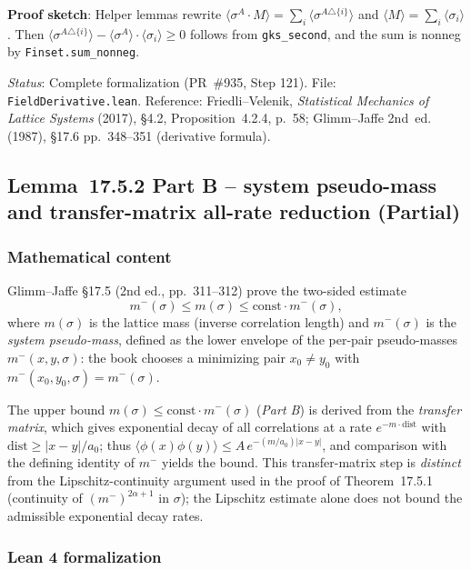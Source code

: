 \documentclass[a4paper,11pt]{article}
\begin{document}
\noindent\textbf{Proof sketch}:
Helper lemmas rewrite $\langle \sigma^A \cdot M \rangle = \sum_i \langle \sigma^{A\triangle\{i\}}\rangle$
and $\langle M \rangle = \sum_i \langle \sigma_i \rangle$.
Then $\langle \sigma^{A\triangle\{i\}}\rangle - \langle \sigma^A \rangle \cdot \langle \sigma_i \rangle \geq 0$
follows from \texttt{gks\_second}, and the sum is nonneg by \texttt{Finset.sum\_nonneg}.

\noindent\textit{Status}: Complete formalization (PR~\#935, Step 121).
File: \texttt{FieldDerivative.lean}.
Reference: Friedli--Velenik, \emph{Statistical Mechanics of Lattice Systems} (2017),
\S4.2, Proposition~4.2.4, p.~58;
Glimm--Jaffe 2nd~ed. (1987), \S17.6 pp.~348--351 (derivative formula).

\subsection*{Lemma~17.5.2 Part B -- system pseudo-mass and transfer-matrix
all-rate reduction (Partial)}

\subsubsection*{Mathematical content}

Glimm--Jaffe \S17.5 (2nd ed., pp.~311--312) prove the two-sided estimate
\[
  m^-(\sigma) \le m(\sigma) \le \mathrm{const}\cdot m^-(\sigma),
\]
where $m(\sigma)$ is the lattice mass (inverse correlation length) and
$m^-(\sigma)$ is the \emph{system pseudo-mass}, defined as the lower envelope of
the per-pair pseudo-masses $m^-(x,y,\sigma)$: the book chooses a minimizing pair
$x_0\neq y_0$ with $m^-(x_0,y_0,\sigma)=m^-(\sigma)$.

The upper bound $m(\sigma)\le\mathrm{const}\cdot m^-(\sigma)$ (\emph{Part B}) is
derived from the \emph{transfer matrix}, which gives exponential decay of all
correlations at a rate $e^{-m\cdot\mathrm{dist}}$ with
$\mathrm{dist}\ge|x-y|/a_0$; thus
$\langle\phi(x)\phi(y)\rangle\le A\,e^{-(m/a_0)|x-y|}$, and comparison with the
defining identity of $m^-$ yields the bound.  This transfer-matrix step is
\emph{distinct} from the Lipschitz-continuity argument used in the proof of
Theorem~17.5.1 (continuity of $(m^-)^{2\alpha+1}$ in $\sigma$); the Lipschitz
estimate alone does not bound the admissible exponential decay rates.

\subsubsection*{Lean 4 formalization}
\end{document}

